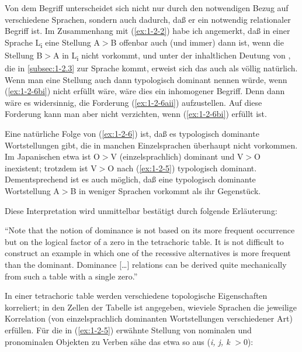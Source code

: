 \documentclass[output=paper]{langsci/langscibook}
\begin{document}

Von dem Begriff  unterscheidet sich  nicht nur durch den notwendigen Bezug auf verschiedene Sprachen, sondern auch dadurch, daß er ein notwendig relationaler Begriff ist. Im Zusammenhang
mit (\ref{ex:1-2-2}) habe ich angemerkt, daß in einer Sprache L\textsubscript{i} eine Stellung A$>$B offenbar auch
(und immer) dann  ist, wenn die Stellung B$>$A in L\textsubscript{i} nicht vorkommt, und
unter der inhaltlichen Deutung von , die in \ref{subsec:1-2.3} zur Sprache kommt, erweist sich das auch als völlig natürlich. Wenn man eine Stellung auch
dann typologisch dominant nennen würde, wenn (\ref{ex:1-2-6bi}) nicht erfüllt wäre, wäre dies
ein inhomogener Begriff. Denn dann wäre es widersinnig, die Forderung (\ref{ex:1-2-6aii}) aufzustellen. Auf diese Forderung kann man aber nicht verzichten, wenn (\ref{ex:1-2-6bi}) erfüllt
ist.

Eine natürliche Folge von (\ref{ex:1-2-6}) ist, daß es typologisch dominante Wortstellungen
gibt, die in manchen Einzelsprachen überhaupt nicht vorkommen. Im Japanischen
etwa ist O$>$V (einzelsprachlich) dominant und V$>$O inexistent; trotzdem ist V$>$O
nach (\ref{ex:1-2-5}) typologisch dominant. Dementsprechend ist es auch möglich, daß eine typologisch dominante Wortstellung A$>$B in weniger Sprachen vorkommt als ihr  Gegenstück.

Diese Interpretation wird unmittelbar bestätigt durch folgende Erläuterung:
\begin{exe}
\ex\label{ex:1-2-7}
"`Note that the notion of dominance is not based on its more frequent occurrence but on the logical factor of a zero in the tetrachoric table. It is not difficult to construct an example in which one of the recessive alternatives is
more frequent than the dominant. Dominance [\ldots] relations can be derived
quite mechanically from such a table with a single zero."' \citep[97]{Greenberg1963}
\end{exe}
In einer tetrachoric table werden verschiedene topologische Eigenschaften korreliert;
in den Zellen der Tabelle ist angegeben, wieviele Sprachen die jeweilige Korrelation
(von einzelsprachlich dominanten Wortstellungen verschiedener Art) erfüllen. Für
die in (\ref{ex:1-2-5}) erwähnte Stellung von nominalen und pronominalen Objekten zu Verben sähe das etwa so aus (\textit{i, j, k} $>0$):
\end{document}
